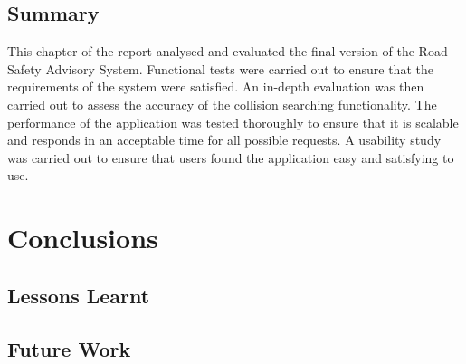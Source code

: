 \documentclass[authoryearcitations]{UoYCSproject}
\begin{document}
\section{Summary}

This chapter of the report analysed and evaluated the final version of the Road Safety Advisory System. Functional tests were carried out to ensure that the requirements of the system were satisfied. An in-depth evaluation was then carried out to assess the accuracy of the collision searching functionality. The performance of the application was tested thoroughly to ensure that it is scalable and responds in an acceptable time for all possible requests. A usability study was carried out to ensure that users found the application easy and satisfying to use. 

\chapter{Conclusions}

\section{Lessons Learnt}

\section{Future Work}



\end{document}
